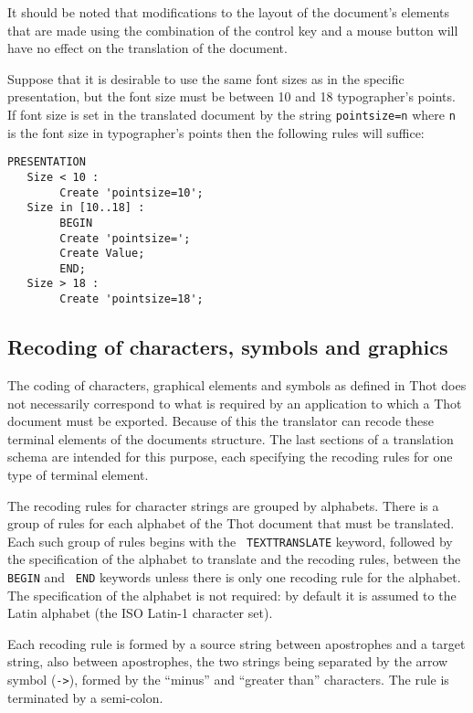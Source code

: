 It should be noted that modifications to the layout of the document's
elements that are made using the combination of the control key and a
mouse button will have no effect on the translation of the document.

\begin{example}
Suppose that it is desirable to use the same font sizes as in the
specific presentation, but the font size must be between 10 and 18
typographer's points.  If font size is set in the translated document
by the string {\tt pointsize=n} where {\tt n} is the font size in
typographer's points then the following rules will suffice:

\begin{verbatim}
PRESENTATION
   Size < 10 :
        Create 'pointsize=10';
   Size in [10..18] :
        BEGIN
        Create 'pointsize=';
        Create Value;
        END;
   Size > 18 :
        Create 'pointsize=18';
\end{verbatim}
\end{example}

\subsection{Recoding of characters, symbols and graphics}
\label{texttrans}

The coding of characters, graphical elements and symbols as defined in
Thot does not necessarily correspond to what is required by an
application to which a Thot document must be exported.  Because of
this the translator can recode these terminal elements of the
documents structure.  The last sections of a translation schema are
intended for this purpose, each specifying the recoding rules for
one type of terminal element.

The recoding rules for character strings are grouped by alphabets.
There is a group of rules for each alphabet of the Thot document that
must be translated.  Each such group of rules begins with the {\tt
TEXTTRANSLATE} keyword, followed by the specification of the alphabet
to translate and the recoding rules, between the {\tt BEGIN} and {\tt
END} keywords unless there is only one recoding rule for the alphabet.
The specification of the alphabet is not required: by default it is
assumed to the Latin alphabet (the ISO Latin-1 character set).

Each recoding rule is formed by a source string between apostrophes
and a target string, also between apostrophes, the two strings being
separated by the arrow symbol ({\tt ->}), formed by the ``minus'' and
``greater than'' characters.  The rule is terminated by a semi-colon.

